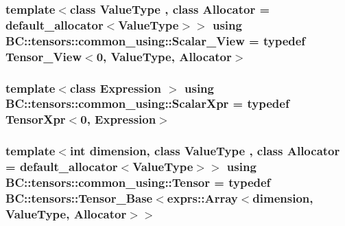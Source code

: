 \subsubsection[{\texorpdfstring{Scalar\+\_\+\+View}{Scalar_View}}]{\setlength{\rightskip}{0pt plus 5cm}template$<$class Value\+Type , class Allocator  = default\+\_\+allocator$<$\+Value\+Type$>$$>$ using {\bf B\+C\+::tensors\+::common\+\_\+using\+::\+Scalar\+\_\+\+View} = typedef {\bf Tensor\+\_\+\+View}$<$0, Value\+Type, {\bf Allocator}$>$}\hypertarget{namespaceBC_1_1tensors_1_1common__using_ad9fc73e6fe618687a49783546fbd6a9f}{}\label{namespaceBC_1_1tensors_1_1common__using_ad9fc73e6fe618687a49783546fbd6a9f}
\subsubsection[{\texorpdfstring{Scalar\+Xpr}{ScalarXpr}}]{\setlength{\rightskip}{0pt plus 5cm}template$<$class Expression $>$ using {\bf B\+C\+::tensors\+::common\+\_\+using\+::\+Scalar\+Xpr} = typedef {\bf Tensor\+Xpr}$<$0, Expression$>$}\hypertarget{namespaceBC_1_1tensors_1_1common__using_a3071d1b3c16b2e974c99dc6cc8b6292d}{}\label{namespaceBC_1_1tensors_1_1common__using_a3071d1b3c16b2e974c99dc6cc8b6292d}
\subsubsection[{\texorpdfstring{Tensor}{Tensor}}]{\setlength{\rightskip}{0pt plus 5cm}template$<$int dimension, class Value\+Type , class Allocator  = default\+\_\+allocator$<$\+Value\+Type$>$$>$ using {\bf B\+C\+::tensors\+::common\+\_\+using\+::\+Tensor} = typedef {\bf B\+C\+::tensors\+::\+Tensor\+\_\+\+Base}$<${\bf exprs\+::\+Array}$<$dimension, Value\+Type, {\bf Allocator}$>$$>$}\hypertarget{namespaceBC_1_1tensors_1_1common__using_ae0b2983dde17bb7904dc64aa0cb9a676}{}\label{namespaceBC_1_1tensors_1_1common__using_ae0b2983dde17bb7904dc64aa0cb9a676}
